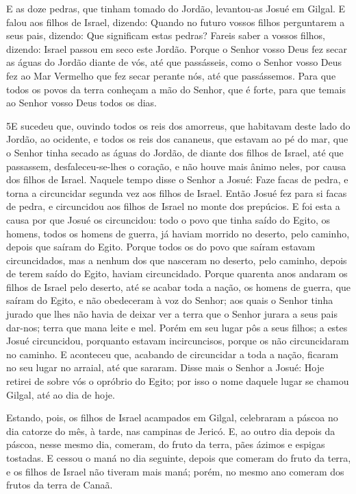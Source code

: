 E as doze pedras, que tinham tomado do Jordão, levantou-as Josué
em Gilgal. E falou aos filhos de Israel, dizendo: Quando no
futuro vossos filhos perguntarem a seus pais, dizendo: Que
significam estas pedras? Fareis saber a vossos filhos,
dizendo: Israel passou em seco este Jordão. Porque o Senhor
vosso Deus fez secar as águas do Jordão diante de vós, até que
passásseis, como o Senhor vosso Deus fez ao Mar Vermelho que fez
secar perante nós, até que passássemos. Para que todos os
povos da terra conheçam a mão do Senhor, que é forte, para que
temais ao Senhor vosso Deus todos os dias.

\medskip

\lettrine{5} E sucedeu que, ouvindo todos os reis dos
amorreus, que habitavam deste lado do Jordão, ao ocidente, e todos
os reis dos cananeus, que estavam ao pé do mar, que o Senhor tinha
secado as águas do Jordão, de diante dos filhos de Israel, até que
passassem, desfaleceu-se-lhes o coração, e não houve mais ânimo
neles, por causa dos filhos de Israel. Naquele tempo disse o
Senhor a Josué: Faze facas de pedra, e torna a circuncidar segunda
vez aos filhos de Israel. Então Josué fez para si facas de
pedra, e circuncidou aos filhos de Israel no monte dos prepúcios.
E foi esta a causa por que Josué os circuncidou: todo o povo que
tinha saído do Egito, os homens, todos os homens de guerra, já
haviam morrido no deserto, pelo caminho, depois que saíram do Egito.
Porque todos os do povo que saíram estavam circuncidados, mas a
nenhum dos que nasceram no deserto, pelo caminho, depois de terem
saído do Egito, haviam circuncidado. Porque quarenta anos
andaram os filhos de Israel pelo deserto, até se acabar toda a
nação, os homens de guerra, que saíram do Egito, e não obedeceram à
voz do Senhor; aos quais o Senhor tinha jurado que lhes não havia de
deixar ver a terra que o Senhor jurara a seus pais dar-nos; terra
que mana leite e mel. Porém em seu lugar pôs a seus filhos; a
estes Josué circuncidou, porquanto estavam incircuncisos, porque os
não circuncidaram no caminho. E aconteceu que, acabando de
circuncidar a toda a nação, ficaram no seu lugar no arraial, até que
sararam. Disse mais o Senhor a Josué: Hoje retirei de sobre vós
o opróbrio do Egito; por isso o nome daquele lugar se chamou Gilgal,
até ao dia de hoje.

Estando, pois, os filhos de Israel acampados em Gilgal,
celebraram a páscoa no dia catorze do mês, à tarde, nas campinas de
Jericó. E, ao outro dia depois da páscoa, nesse mesmo dia,
comeram, do fruto da terra, pães ázimos e espigas tostadas. E
cessou o maná no dia seguinte, depois que comeram do fruto da terra,
e os filhos de Israel não tiveram mais maná; porém, no mesmo ano
comeram dos frutos da terra de Canaã.

